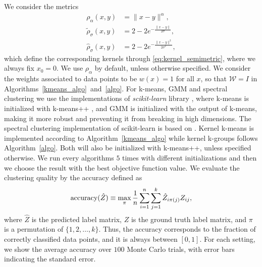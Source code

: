 \documentclass[10pt,journal,compsoc]{IEEEtran}
\newcommand\kk{K}
\newcommand\W{{\mathcal{W}}}
\begin{document}
We consider
the metrics
\begin{align}
\rho_{\alpha}(x,y) &= \| x-y \|^{\alpha}, 
\label{eq:rho_alpha} \\
%
\widetilde{\rho}_{\sigma}(x,y) &= 2 - 2 e^{-\tfrac{\|x-y\|}{2 \sigma}},  
\label{eq:rho_tilde}\\
%
\widehat{\rho}_{\sigma}(x,y) &= 2 - 2 e^{-\tfrac{\|x-y\|^2}{2 \sigma^2}},
\label{eq:rho_hat}
\end{align}
which define the 
corresponding kernels through 
\eqref{eq:kernel_semimetric}, where we always fix $x_0=0$.
We use $\rho_\alpha$ by default, unless otherwise specified.
We consider the weights associated to data points to be $w(x) = 1$ for
all $x$, so that $\W = I$ in 
Algorithms~\ref{kmeans_algo}~and~\ref{algo}.
For k-means, GMM and spectral clustering we use the
implementations of \emph{scikit-learn} library \cite{scikit-learn}, where  
k-means is initialized with 
k-means++ \cite{Vassilvitskii}, 
and GMM is initialized with the output of k-means, making 
it more robust and preventing
it from breaking in high dimensions. 
The spectral clustering implementation of scikit-learn 
is based on \cite{Malik}. 
Kernel k-means is implemented according to Algorithm~\ref{kmeans_algo} while
kernel k-groups follows Algorithm~\ref{algo}.
Both will also be initialized with k-means++, unless specified otherwise.
We run every algorithms $5$ times with different initializations and then
we choose the result with the best objective function value. 
We evaluate the clustering quality by
the accuracy defined as
\begin{equation}
\label{eq:accuracy}
\textnormal{accuracy}(\hat{Z}) \equiv \max_\pi
\dfrac{1}{n}\sum_{i=1}^n\sum_{j=1}^k \hat{Z}_{i \pi(j)} Z_{ij} ,
\end{equation}
where $\hat{Z}$ is the predicted label matrix, $Z$
is the ground truth label matrix, 
and $\pi$ is a permutation of $\{1,2,\dotsc,k\}$. 
Thus, the accuracy corresponds to the fraction
of correctly classified data points, and it is always between $[0,1]$.
For each setting, we show the average accuracy over $100$ Monte
Carlo trials, with error bars indicating the standard error.
\end{document}

